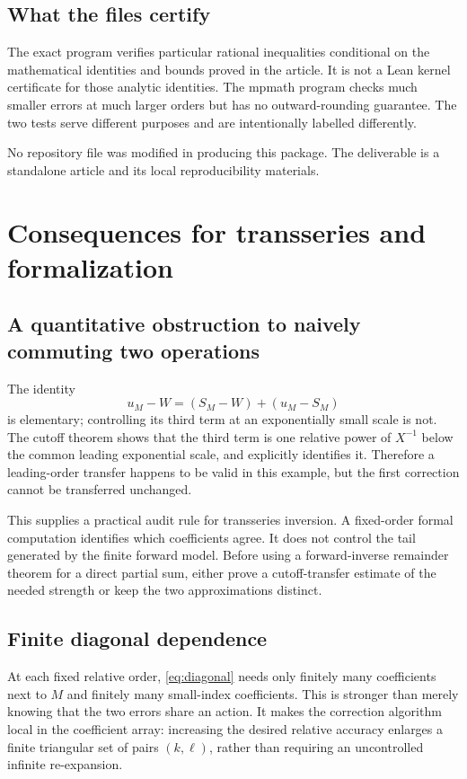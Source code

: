 \documentclass[11pt,a4paper]{article}
\theoremstyle{definition}
\numberwithin{equation}{section}
\begin{document}
\subsection{What the files certify}
The exact program verifies particular rational inequalities conditional on the mathematical identities and bounds proved in the article. It is not a Lean kernel certificate for those analytic identities. The mpmath program checks much smaller errors at much larger orders but has no outward-rounding guarantee. The two tests serve different purposes and are intentionally labelled differently.

No repository file was modified in producing this package. The deliverable is a standalone article and its local reproducibility materials.

\section{Consequences for transseries and formalization}
\label{sec:consequences}

\subsection{A quantitative obstruction to naively commuting two operations}
The identity
\begin{equation}
 u_M-W=(S_M-W)+(u_M-S_M)
 \label{eq:decomposition}
\end{equation}
is elementary; controlling its third term at an exponentially small scale is not. The cutoff theorem shows that the third term is one relative power of $X^{-1}$ below the common leading exponential scale, and explicitly identifies it. Therefore a leading-order transfer happens to be valid in this example, but the first correction cannot be transferred unchanged.

This supplies a practical audit rule for transseries inversion. A fixed-order formal computation identifies which coefficients agree. It does not control the tail generated by the finite forward model. Before using a forward-inverse remainder theorem for a direct partial sum, either prove a cutoff-transfer estimate of the needed strength or keep the two approximations distinct.

\subsection{Finite diagonal dependence}
At each fixed relative order, \eqref{eq:diagonal} needs only finitely many coefficients next to $M$ and finitely many small-index coefficients. This is stronger than merely knowing that the two errors share an action. It makes the correction algorithm local in the coefficient array: increasing the desired relative accuracy enlarges a finite triangular set of pairs $(k,\ell)$, rather than requiring an uncontrolled infinite re-expansion.
\end{document}

